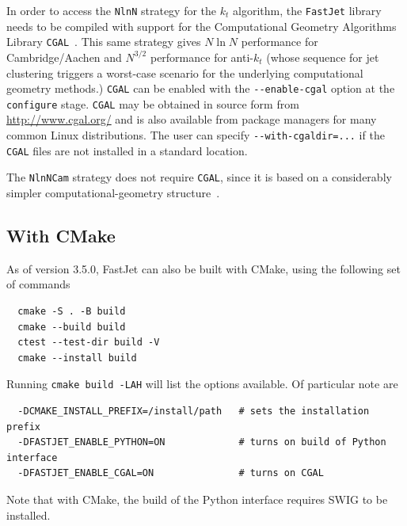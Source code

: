 \documentclass[12pt,a4]{article}
\newcommand{\fastjet}{\texttt{FastJet}\xspace}
\newcommand{\ttt}[1]{{\small\texttt{#1}}}
\begin{document}
In order to access the \ttt{NlnN} strategy for the $k_t$ algorithm,
the \fastjet library needs to be compiled with support for the
Computational Geometry Algorithms Library \ttt{CGAL}~\cite{CGAL}. This
same strategy gives $N\ln N$ performance for Cambridge/Aachen and
$N^{3/2}$ performance for anti-$k_t$ (whose sequence for jet
clustering triggers a worst-case scenario for the underlying
computational geometry methods.)
%
\ttt{CGAL} can be enabled with the \verb|--enable-cgal| option at the
\ttt{configure} stage.
%
\ttt{CGAL} may be obtained in source form from
\url{http://www.cgal.org/} and is also available from package managers for
many common Linux distributions.
%
The user can specify
\verb|--with-cgaldir=...| if the \ttt{CGAL} files are not installed in a
standard location.
%

The \ttt{NlnNCam} strategy does not require \ttt{CGAL}, since it is based on
a considerably simpler computational-geometry structure~\cite{Chan}.

\subsection{With CMake}

As of version 3.5.0, FastJet can also be built with CMake, using the following 
set of commands
\begin{verbatim}
  cmake -S . -B build
  cmake --build build
  ctest --test-dir build -V
  cmake --install build  
\end{verbatim}
Running \ttt{cmake build -LAH} will list the options available. Of particular 
note are 
\begin{verbatim}
  -DCMAKE_INSTALL_PREFIX=/install/path   # sets the installation prefix
  -DFASTJET_ENABLE_PYTHON=ON             # turns on build of Python interface
  -DFASTJET_ENABLE_CGAL=ON               # turns on CGAL
\end{verbatim}
Note that with CMake, the build of the Python interface requires SWIG to be installed. 
\end{document}
